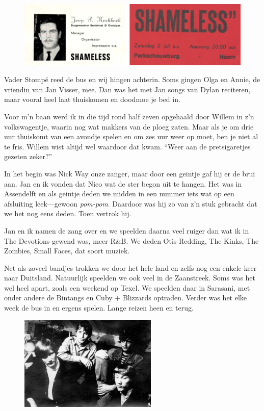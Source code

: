 \documentclass[10pt,twoside, openright]{memoir}
\begin{document}
\begin{figure}
\includegraphics[width=\textwidth]{img/ch30/shameless2}
\end{figure}

Vader Stompé reed de bus en wij hingen achterin. Soms gingen Olga en Annie, de vriendin van Jan Visser, mee. Dan was het met Jan songs van Dylan reciteren, maar vooral heel laat thuiskomen en doodmoe je bed in.

Voor m'n baan werd ik in die tijd rond half zeven opgehaald door Willem in z’n volkswagentje, waarin nog wat makkers van de ploeg zaten. Maar als je om drie uur thuiskomt van een avondje spelen en om zes uur weer op moet, ben je niet al te fris. Willem wist altijd wel waardoor dat kwam. ``Weer aan de pretsigaretjes gezeten zeker?''

In het begin was Nick Way onze zanger, maar door een geintje gaf hij er de brui aan. Jan en ik  vonden dat Nico wat de ster begon uit te hangen. Het was in Assendelft en als geintje deden we midden in een nummer iets wat op een afsluiting leek---gewoon \emph{pom-pom}. Daardoor was hij zo van z’n stuk gebracht dat we het nog eens deden. Toen vertrok hij.

Jan en ik namen de zang over en we speelden daarna veel ruiger dan wat ik in The Devotions gewend was, meer R&B. We deden Otis Redding, The Kinks, The Zombies, Small Faces, dat soort muziek.

Net als zoveel bandjes trokken we door het hele land en zelfs nog een enkele keer naar Duitsland. Natuurlijk speelden we ook veel in de Zaanstreek. Soms was het wel heel apart, zoals een weekend op Texel. We speelden daar in Sarasani, met onder andere de Bintangs en Cuby + Blizzards optraden. Verder was het elke week de bus in en ergens spelen. Lange reizen heen en terug.

\begin{figure}
\includegraphics[width=\textwidth]{img/ch30/optournee2a}
\end{figure}
\end{document}

